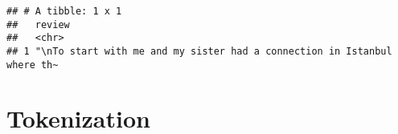 \documentclass[]{article}
\newenvironment{Shaded}{\begin{snugshade}}{\end{snugshade}}
\newcommand{\KeywordTok}[1]{\textcolor[rgb]{0.13,0.29,0.53}{\textbf{#1}}}
\newcommand{\DecValTok}[1]{\textcolor[rgb]{0.00,0.00,0.81}{#1}}
\newcommand{\StringTok}[1]{\textcolor[rgb]{0.31,0.60,0.02}{#1}}
\newcommand{\OperatorTok}[1]{\textcolor[rgb]{0.81,0.36,0.00}{\textbf{#1}}}
\newcommand{\NormalTok}[1]{#1}
\begin{document}
\begin{Shaded}
\end{Shaded}

\begin{verbatim}
## # A tibble: 1 x 1
##   review                                                                  
##   <chr>                                                                   
## 1 "\nTo start with me and my sister had a connection in Istanbul where th~
\end{verbatim}

\section{Tokenization}\label{tokenization}
\end{document}
